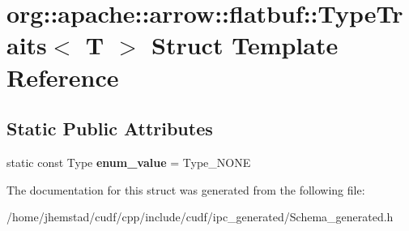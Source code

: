 \hypertarget{structorg_1_1apache_1_1arrow_1_1flatbuf_1_1TypeTraits}{}\section{org\+:\+:apache\+:\+:arrow\+:\+:flatbuf\+:\+:Type\+Traits$<$ T $>$ Struct Template Reference}
\label{structorg_1_1apache_1_1arrow_1_1flatbuf_1_1TypeTraits}
\subsection*{Static Public Attributes}
\begin{DoxyCompactItemize}
\item 
static const Type {\bfseries enum\+\_\+value} = Type\+\_\+\+N\+O\+NE\hypertarget{structorg_1_1apache_1_1arrow_1_1flatbuf_1_1TypeTraits_a613cb517e6ed993291c1ef95f7304236}{}\label{structorg_1_1apache_1_1arrow_1_1flatbuf_1_1TypeTraits_a613cb517e6ed993291c1ef95f7304236}

\end{DoxyCompactItemize}


The documentation for this struct was generated from the following file\+:\begin{DoxyCompactItemize}
\item 
/home/jhemstad/cudf/cpp/include/cudf/ipc\+\_\+generated/Schema\+\_\+generated.\+h\end{DoxyCompactItemize}

